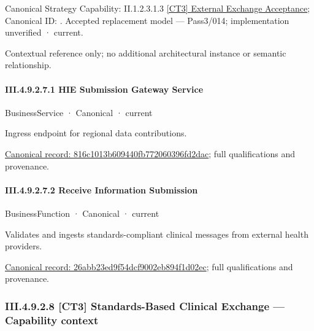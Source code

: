 {\small Canonical Strategy Capability: II.1.2.3.1.3 \hyperref[element:ff8ab280fa034c10b846a147ab7dbfb3]{[CT3] External Exchange Acceptance}; Canonical ID: \texttt{}. Accepted replacement model — Pass3/014; implementation unverified · current.}\par
Contextual reference only; no additional architectural instance or semantic relationship.\par
\paragraph*{III.4.9.2.7.1 HIE Submission Gateway Service}
\label{navigation:III.4.9.2.7.1}

\label{element:816c1013b609440fb772060396fd2dac}
{\small BusinessService · Canonical · current}\par

Ingress endpoint for regional data contributions.


{\footnotesize \href{../../../../../../../../continuum/business/business-service/816c1013b609440fb772060396fd2dac.md}{Canonical record: 816c1013b609440fb772060396fd2dac}; full qualifications and provenance.}\par
\paragraph*{III.4.9.2.7.2 Receive Information Submission}
\label{navigation:III.4.9.2.7.2}

\label{element:26abb23ed9f54dcf9002eb894f1d02ec}
{\small BusinessFunction · Canonical · current}\par

Validates and ingests standards-compliant clinical messages from external health providers.


{\footnotesize \href{../../../../../../../../continuum/business/business-function/26abb23ed9f54dcf9002eb894f1d02ec.md}{Canonical record: 26abb23ed9f54dcf9002eb894f1d02ec}; full qualifications and provenance.}\par
\subsubsection*{III.4.9.2.8 [CT3] Standards-Based Clinical Exchange — Capability context}
\label{navigation:III.4.9.2.8}

